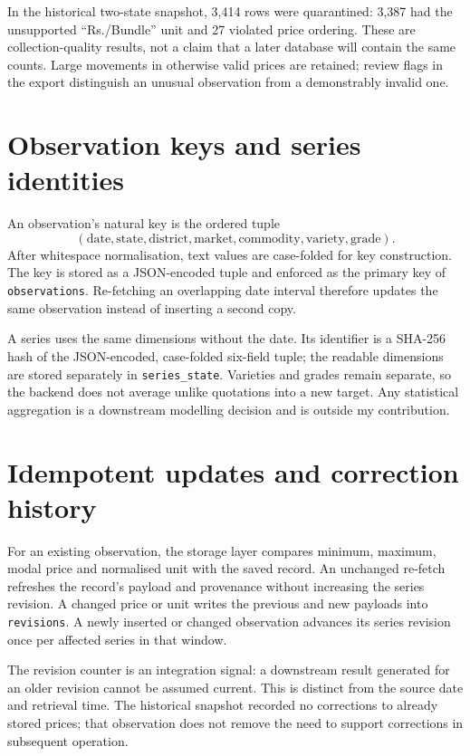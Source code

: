 \documentclass[12pt,a4paper,oneside]{report}
\numberwithin{equation}{chapter}
\numberwithin{figure}{chapter}
\numberwithin{table}{chapter}
\theoremstyle{definition}
\begin{document}
In the historical two-state snapshot, 3,414 rows were quarantined: 3,387 had the unsupported ``Rs./Bundle'' unit and 27 violated price ordering. These are collection-quality results, not a claim that a later database will contain the same counts. Large movements in otherwise valid prices are retained; review flags in the export distinguish an unusual observation from a demonstrably invalid one.

\section{Observation keys and series identities}
An observation's natural key is the ordered tuple
\[
(\text{date},\text{state},\text{district},\text{market},
 \text{commodity},\text{variety},\text{grade}).
\]
After whitespace normalisation, text values are case-folded for key construction. The key is stored as a JSON-encoded tuple and enforced as the primary key of \texttt{observations}. Re-fetching an overlapping date interval therefore updates the same observation instead of inserting a second copy.

A series uses the same dimensions without the date. Its identifier is a SHA-256 hash of the JSON-encoded, case-folded six-field tuple; the readable dimensions are stored separately in \texttt{series\_state}. Varieties and grades remain separate, so the backend does not average unlike quotations into a new target. Any statistical aggregation is a downstream modelling decision and is outside my contribution.

\section{Idempotent updates and correction history}
For an existing observation, the storage layer compares minimum, maximum, modal price and normalised unit with the saved record. An unchanged re-fetch refreshes the record's payload and provenance without increasing the series revision. A changed price or unit writes the previous and new payloads into \texttt{revisions}. A newly inserted or changed observation advances its series revision once per affected series in that window.

The revision counter is an integration signal: a downstream result generated for an older revision cannot be assumed current. This is distinct from the source date and retrieval time. The historical snapshot recorded no corrections to already stored prices; that observation does not remove the need to support corrections in subsequent operation.
\end{document}
